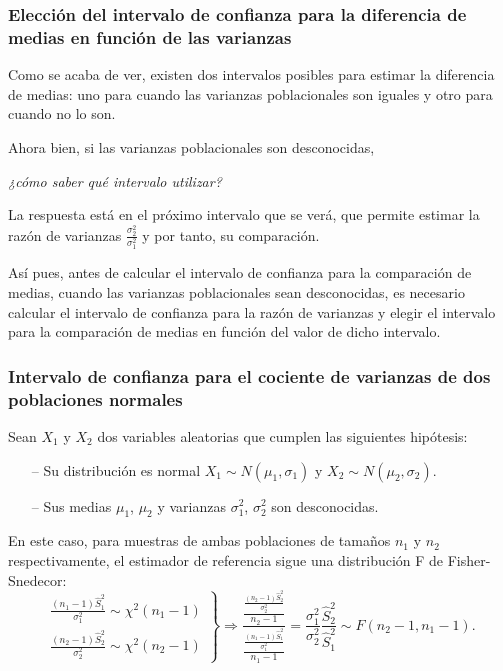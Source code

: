 \begin{frame}
\frametitle{Elección del intervalo de confianza para la diferencia de medias en función de las varianzas}
Como se acaba de ver, existen dos intervalos posibles para estimar la diferencia de medias: uno para cuando las varianzas poblacionales son iguales y otro para cuando no lo son.

Ahora bien, si las varianzas poblacionales son desconocidas,
\begin{center}
\emph{¿cómo saber qué intervalo utilizar?}
\end{center}

La respuesta está en el próximo intervalo que se verá, que permite estimar la razón de varianzas $\frac{\sigma_2^2}{\sigma_1^2}$ y por tanto, su comparación.

Así pues, antes de calcular el intervalo de confianza para la comparación de medias, cuando las varianzas poblacionales sean desconocidas, es necesario calcular el intervalo de confianza para la razón de varianzas y elegir el intervalo para la comparación de medias en función del valor de dicho intervalo.
\end{frame}


\begin{frame}
\frametitle{Intervalo de confianza para el cociente de varianzas de dos poblaciones normales}
Sean $X_1$ y $X_2$ dos variables aleatorias que cumplen las siguientes hipótesis:
\begin{itemize}
\item[--] Su distribución es normal $X_1\sim N(\mu_1,\sigma_1)$ y $X_2\sim N(\mu_2,\sigma_2)$.
\item[--] Sus medias $\mu_1$, $\mu_2$ y varianzas $\sigma_1^2$, $\sigma_2^2$ son desconocidas.
\end{itemize}
En este caso, para muestras de ambas poblaciones de tamaños $n_1$ y $n_2$ respectivamente, el estimador de referencia sigue una distribución F de Fisher-Snedecor:
\[
\left.
\begin{array}{l}
\displaystyle \frac{(n_1-1)\hat{S}_1^2}{\sigma_1^2}\sim \chi^2(n_1-1) \\
\displaystyle \frac{(n_2-1)\hat{S}_2^2}{\sigma_2^2}\sim \chi^2(n_2-1)
\end{array}
\right\}
\Rightarrow
\frac{\frac{\frac{(n_2-1)\hat{S}_2^2}{\sigma_2^2}}{n_2-1}}{\frac{\frac{(n_1-1)\hat{S}_1^2}{\sigma_1^2}}{n_1-1}} =
\frac{\sigma_1^2}{\sigma_2^2}\frac{\hat{S}_2^2}{\hat{S}_1^2}\sim F(n_2-1,n_1-1).
\]
\end{frame}


